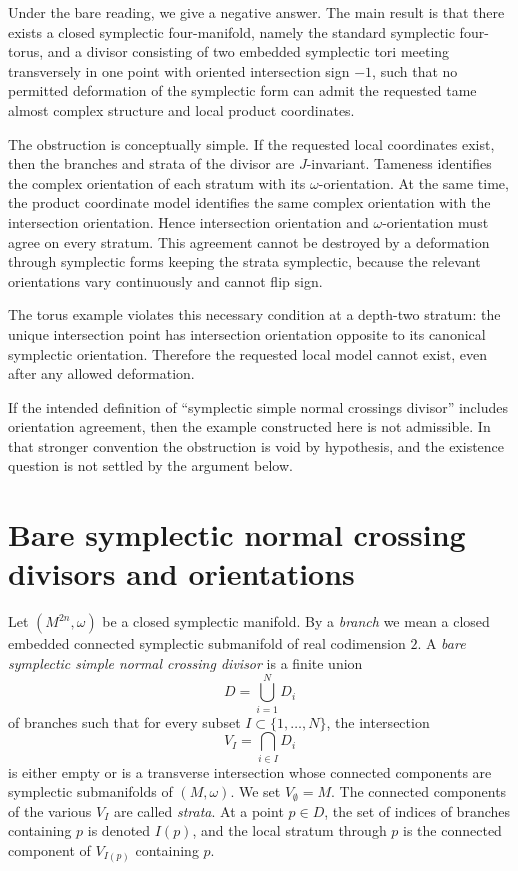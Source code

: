 \documentclass[12pt]{article}
\begin{document}
Under the bare reading, we give a negative answer. The main result is that there exists a closed symplectic four-manifold, namely the standard symplectic four-torus, and a divisor consisting of two embedded symplectic tori meeting transversely in one point with oriented intersection sign \(-1\), such that no permitted deformation of the symplectic form can admit the requested tame almost complex structure and local product coordinates.

The obstruction is conceptually simple. If the requested local coordinates exist, then the branches and strata of the divisor are \(J\)-invariant. Tameness identifies the complex orientation of each stratum with its \(\omega\)-orientation. At the same time, the product coordinate model identifies the same complex orientation with the intersection orientation. Hence intersection orientation and \(\omega\)-orientation must agree on every stratum. This agreement cannot be destroyed by a deformation through symplectic forms keeping the strata symplectic, because the relevant orientations vary continuously and cannot flip sign.

The torus example violates this necessary condition at a depth-two stratum: the unique intersection point has intersection orientation opposite to its canonical symplectic orientation. Therefore the requested local model cannot exist, even after any allowed deformation.

If the intended definition of ``symplectic simple normal crossings divisor'' includes orientation agreement, then the example constructed here is not admissible. In that stronger convention the obstruction is void by hypothesis, and the existence question is not settled by the argument below.

\section{Bare symplectic normal crossing divisors and orientations}

Let \((M^{2n},\omega)\) be a closed symplectic manifold. By a \emph{branch} we mean a closed embedded connected symplectic submanifold of real codimension \(2\). A \emph{bare symplectic simple normal crossing divisor} is a finite union
\[
D=\bigcup_{i=1}^N D_i
\]
of branches such that for every subset \(I\subset\{1,\dots,N\}\), the intersection
\[
V_I=\bigcap_{i\in I}D_i
\]
is either empty or is a transverse intersection whose connected components are symplectic submanifolds of \((M,\omega)\). We set \(V_\emptyset=M\). The connected components of the various \(V_I\) are called \emph{strata}. At a point \(p\in D\), the set of indices of branches containing \(p\) is denoted \(I(p)\), and the local stratum through \(p\) is the connected component of \(V_{I(p)}\) containing \(p\).
\end{document}
